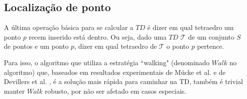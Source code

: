 \subsection{Localização de ponto}

A última operação básica para se calcular a $TD$ é dizer em qual tetraedro um ponto
$p$ recem inserido está dentro. Ou seja, dado uma $TD$ $\mathcal{T}$ de um conjunto
$S$ de pontos e um ponto $p$, dizer em qual tetraedro de $\mathcal{T}$ o ponto $p$
pertence.

Para isso, o algoritmo que utiliza a estratégia ``walking" (denominado $Walk$ no algoritmo) 
que, baseados em resultados experimentais de Mücke et al. \cite{Mucke1996} e de Devillers 
et al. \cite{Devillers2001}, é a solução mais rápida para caminhar na TD, também é
trivial manter $Walk$ robusto, por não ser afetado em casos especiais.
